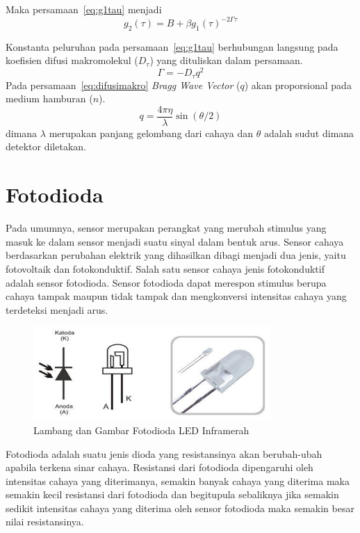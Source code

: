 \noindent
Maka persamaan~\ref{eq:g1tau} menjadi
\begin{equation}
    g_2(\tau) = B + \beta g_1(\tau)^{-2\Gamma \tau}
\end{equation}

Konstanta peluruhan pada persamaan~\ref{eq:g1tau} berhubungan langsung pada koefisien difusi
makromolekul (${D_{\tau}}$) yang dituliskan dalam persamaan.
\begin{equation}
    \Gamma = -D_{\tau} q^2
    \label{eq:difusimakro}
\end{equation}
\noindent
Pada persamaan~\ref{eq:difusimakro} \textit{Bragg Wave Vector} (${q}$) akan proporsional pada
medium hamburan (${n}$).
\begin{equation}
    q = \frac{4\pi \eta}{\lambda} \sin (\theta / 2)
\end{equation}
\noindent
dimana ${\lambda}$ merupakan panjang gelombang dari cahaya dan ${\theta}$ adalah sudut dimana
detektor diletakan.




\section{Fotodioda}
Pada umumnya, sensor merupakan perangkat yang merubah stimulus yang masuk ke dalam sensor menjadi
suatu sinyal dalam bentuk arus. Sensor cahaya berdasarkan perubahan elektrik yang dihasilkan dibagi
menjadi dua jenis, yaitu fotovoltaik dan fotokonduktif. Salah satu sensor cahaya jenis fotokonduktif
adalah sensor fotodioda. Sensor fotodioda dapat merespon stimulus berupa cahaya tampak maupun tidak
tampak dan mengkonversi intensitas cahaya yang terdeteksi menjadi arus\cite{Setyaningsih2017}.

\begin{figure}[H]
    \centering
    \includegraphics{Images/Fotodioda.png}
    \caption{Lambang dan Gambar Fotodioda LED Inframerah}
    \label{fig:led photodiode}
\end{figure}

Fotodioda adalah suatu jenis dioda yang resistansinya akan berubah-ubah apabila terkena sinar
cahaya. Resistansi dari fotodioda dipengaruhi oleh intensitas cahaya yang diterimanya, semakin
banyak cahaya yang diterima maka semakin kecil resistansi dari fotodioda dan begitupula sebaliknya
jika semakin sedikit intensitas cahaya yang diterima oleh sensor fotodioda maka semakin besar nilai
resistansinya\cite{Setyaningsih2017,Arta2020}.

